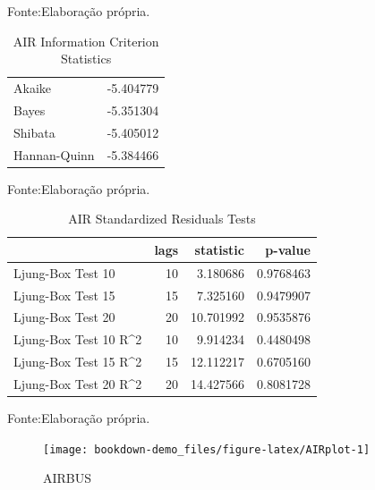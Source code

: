 \documentclass[
  12pt,
  a4paper,
  openany]{book}
\begin{document}
Fonte:Elaboração própria.

\justifying
\bigskip

\begin{table}[!h]

\caption{\label{tab:unnamed-chunk-32}AIR Information Criterion Statistics}
\centering
\begin{tabular}[t]{lr}
\toprule
  & \\
\midrule
Akaike & -5.404779\\
Bayes & -5.351304\\
Shibata & -5.405012\\
Hannan-Quinn & -5.384466\\
\bottomrule
\end{tabular}
\end{table}
\FloatBarrier
\centering

Fonte:Elaboração própria.

\justifying
\bigskip

\begin{table}[!h]

\caption{\label{tab:unnamed-chunk-33}AIR Standardized Residuals Tests}
\centering
\begin{tabular}[t]{lrrr}
\toprule
  & lags & statistic & p-value\\
\midrule
Ljung-Box Test 10 & 10 & 3.180686 & 0.9768463\\
Ljung-Box Test 15 & 15 & 7.325160 & 0.9479907\\
Ljung-Box Test 20 & 20 & 10.701992 & 0.9535876\\
Ljung-Box Test 10 R\textasciicircum{}2 & 10 & 9.914234 & 0.4480498\\
Ljung-Box Test 15 R\textasciicircum{}2 & 15 & 12.112217 & 0.6705160\\
\addlinespace
Ljung-Box Test 20 R\textasciicircum{}2 & 20 & 14.427566 & 0.8081728\\
\bottomrule
\end{tabular}
\end{table}
\FloatBarrier
\centering

Fonte:Elaboração própria.

\justifying
\bigskip
\begin{figure}

{\centering \texttt{[image: bookdown-demo\_files/figure-latex/AIRplot-1]} 

}

\caption{AIRBUS}\label{fig:AIRplot}
\end{figure}
\FloatBarrier
\centering
\end{document}
